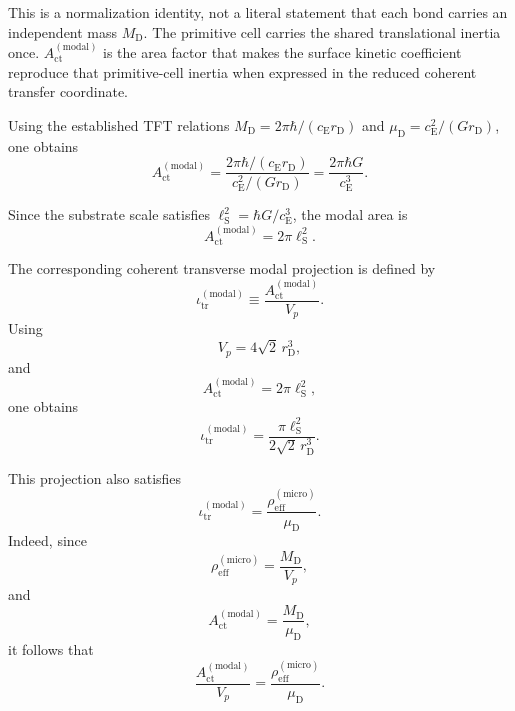This is a normalization identity, not a literal statement that each bond carries an independent mass $M_{\mathrm{D}}$. The primitive cell carries the shared translational inertia once. $A_{\mathrm{ct}}^{(\mathrm{modal})}$ is the area factor that makes the surface kinetic coefficient reproduce that primitive-cell inertia when expressed in the reduced coherent transfer coordinate.

Using the established TFT relations $M_{\mathrm{D}} = 2\pi\hbar / (c_{\mathrm{E}}r_{\mathrm{D}})$ and $\mu_{\mathrm{D}} = c_{\mathrm{E}}^2 / (G r_{\mathrm{D}})$, one obtains
\begin{equation}
    A_{\mathrm{ct}}^{(\mathrm{modal})} = \frac{ 2\pi\hbar/(c_{\mathrm{E}}r_{\mathrm{D}}) }{ c_{\mathrm{E}}^2/(G r_{\mathrm{D}}) } = \frac{2\pi\hbar G}{c_{\mathrm{E}}^3}.
\end{equation}

Since the substrate scale satisfies $\ell_{\mathrm{S}}^2 = \hbar G / c_{\mathrm{E}}^3$, the modal area is
\begin{equation}
    \boxed{ A_{\mathrm{ct}}^{(\mathrm{modal})} = 2\pi\ell_{\mathrm{S}}^2 }.
\end{equation}

The corresponding coherent transverse modal projection is defined by
\begin{equation}
    \iota_{\mathrm{tr}}^{(\mathrm{modal})}
    \equiv
    \frac{
    A_{\mathrm{ct}}^{(\mathrm{modal})}
    }{
    V_p
    }.
\end{equation}
Using
\begin{equation}
    V_p
    =
    4\sqrt2\,r_{\mathrm D}^3,
\end{equation}
and
\begin{equation}
    A_{\mathrm{ct}}^{(\mathrm{modal})}
    =
    2\pi\ell_{\mathrm S}^2,
\end{equation}
one obtains
\begin{equation}
    \iota_{\mathrm{tr}}^{(\mathrm{modal})}
    =
    \frac{
    \pi\ell_{\mathrm S}^2
    }{
    2\sqrt2\,r_{\mathrm D}^3
    }.
\end{equation}

This projection also satisfies
\begin{equation}
    \iota_{\mathrm{tr}}^{(\mathrm{modal})}
    =
    \frac{
    \rho_{\mathrm{eff}}^{(\mathrm{micro})}
    }{
    \mu_{\mathrm D}
    }.
\end{equation}
Indeed, since
\begin{equation}
    \rho_{\mathrm{eff}}^{(\mathrm{micro})}
    =
    \frac{M_{\mathrm D}}{V_p},
\end{equation}
and
\begin{equation}
    A_{\mathrm{ct}}^{(\mathrm{modal})}
    =
    \frac{M_{\mathrm D}}{\mu_{\mathrm D}},
\end{equation}
it follows that
\begin{equation}
    \frac{
    A_{\mathrm{ct}}^{(\mathrm{modal})}
    }{
    V_p
    }
    =
    \frac{
    \rho_{\mathrm{eff}}^{(\mathrm{micro})}
    }{
    \mu_{\mathrm D}
    }.
\end{equation}

